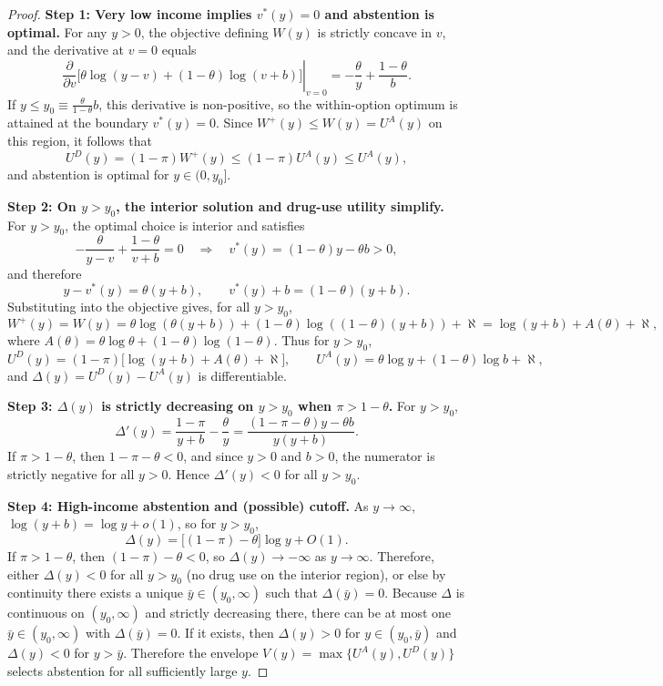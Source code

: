 \begin{proof}
\textbf{Step 1: Very low income implies $v^*(y)=0$ and abstention is optimal.}
For any $y>0$, the objective defining $W(y)$ is strictly concave in $v$, and the derivative at $v=0$ equals
\[
\left.\frac{\partial}{\partial v}\big[\theta\log(y-v)+(1-\theta)\log(v+b)\big]\right|_{v=0}
= -\frac{\theta}{y}+\frac{1-\theta}{b}.
\]
If $y\le y_0\equiv \frac{\theta}{1-\theta}b$, this derivative is non-positive, so the within-option optimum is attained at the boundary $v^*(y)=0$.
Since $W^{+}(y)\le W(y)=U^A(y)$ on this region, it follows that
\[
U^D(y)=(1-\pi)W^{+}(y)\le (1-\pi)U^A(y)\le U^A(y),
\]
and abstention is optimal for $y\in(0,y_0]$.

\medskip
\noindent\textbf{Step 2: On $y>y_0$, the interior solution and drug-use utility simplify.}
For $y>y_0$, the optimal choice is interior and satisfies
\[
-\frac{\theta}{y-v}+\frac{1-\theta}{v+b}=0
\quad\Longrightarrow\quad
v^*(y)=(1-\theta)y-\theta b>0,
\]
and therefore
\[
y-v^*(y)=\theta(y+b),\qquad v^*(y)+b=(1-\theta)(y+b).
\]
Substituting into the objective gives, for all $y>y_0$,
\[
W^{+}(y)=W(y)=\theta\log(\theta(y+b))+(1-\theta)\log((1-\theta)(y+b))+\aleph
=\log(y+b)+A(\theta)+\aleph,
\]
where $A(\theta)=\theta\log\theta+(1-\theta)\log(1-\theta)$.
Thus for $y>y_0$,
\[
U^D(y)=(1-\pi)\big[\log(y+b)+A(\theta)+\aleph\big],
\qquad
U^A(y)=\theta\log y+(1-\theta)\log b+\aleph,
\]
and $\Delta(y)=U^D(y)-U^A(y)$ is differentiable.

\medskip
\noindent\textbf{Step 3: $\Delta(y)$ is strictly decreasing on $y>y_0$ when $\pi>1-\theta$.}
For $y>y_0$,
\[
\Delta'(y)=\frac{1-\pi}{y+b}-\frac{\theta}{y}
=\frac{(1-\pi-\theta)y-\theta b}{y(y+b)}.
\]
If $\pi>1-\theta$, then $1-\pi-\theta<0$, and since $y>0$ and $b>0$, the numerator is strictly negative for all $y>0$.
Hence $\Delta'(y)<0$ for all $y>y_0$.

\medskip
\noindent\textbf{Step 4: High-income abstention and (possible) cutoff.}
As $y\to\infty$, $\log(y+b)=\log y+o(1)$, so for $y>y_0$,
\[
\Delta(y)=\big[(1-\pi)-\theta\big]\log y + O(1).
\]
If $\pi>1-\theta$, then $(1-\pi)-\theta<0$, so $\Delta(y)\to -\infty$ as $y\to\infty$. Therefore, either $\Delta(y)<0$ for all $y>y_0$ (no drug use on the interior region), or else by continuity there exists a unique $\bar y\in(y_0,\infty)$ such that $\Delta(\bar y)=0$. Because $\Delta$ is continuous on $(y_0,\infty)$ and strictly decreasing there, there can be at most one $\bar y\in(y_0,\infty)$ with $\Delta(\bar y)=0$. If it exists, then $\Delta(y)>0$ for $y\in(y_0,\bar y)$ and $\Delta(y)<0$ for $y>\bar y$. Therefore the envelope $V(y)=\max\{U^A(y),U^D(y)\}$ selects abstention for all sufficiently large $y$.
\end{proof}


